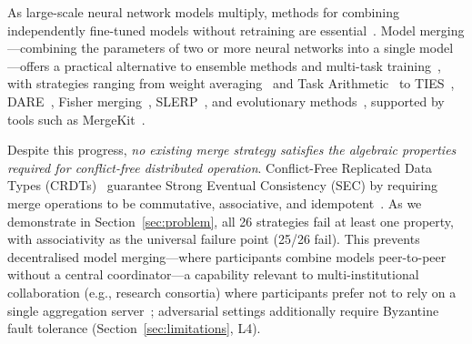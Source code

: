 \documentclass[10pt,letterpaper]{article}
\begin{document}
As large-scale neural network models multiply, methods for combining independently fine-tuned models without retraining are essential~\cite{yang2024survey, wortsman2022model}.
Model merging---combining the parameters of two or more neural networks into a single model---offers a practical alternative to ensemble methods and multi-task training~\cite{wortsman2022model, ilharco2023editing}, with strategies ranging from weight averaging~\cite{wortsman2022model} and Task Arithmetic~\cite{ilharco2023editing} to TIES~\cite{yadav2023ties}, DARE~\cite{yu2024dare}, Fisher merging~\cite{matena2022merging}, SLERP~\cite{shoemake1985animating}, and evolutionary methods~\cite{akiba2025evolutionary}, supported by tools such as MergeKit~\cite{goddard2024mergekit}.

Despite this progress, \emph{no existing merge strategy satisfies the algebraic properties required for conflict-free distributed operation}.
Conflict-Free Replicated Data Types (CRDTs)~\cite{shapiro2011conflict, shapiro2011comprehensive} guarantee Strong Eventual Consistency (SEC) by requiring merge operations to be commutative, associative, and idempotent~\cite{preguica2018conflict, vogels2009eventually}.
As we demonstrate in Section~\ref{sec:problem}, all 26 strategies fail at least one property, with associativity as the universal failure point (25/26 fail).
This prevents decentralised model merging---where participants combine models peer-to-peer without a central coordinator---a capability relevant to multi-institutional collaboration (e.g., research consortia) where participants prefer not to rely on a single aggregation server~\cite{kairouz2021advances, bonawitz2019towards}; adversarial settings additionally require Byzantine fault tolerance (Section~\ref{sec:limitations}, L4).
\end{document}
